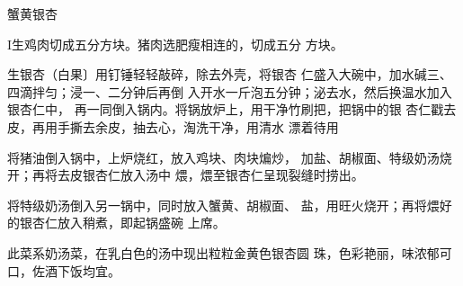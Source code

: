 \begin{recipe}{蟹黄银杏}

\ingredients



\cooking

I生鸡肉切成五分方块。猪肉选肥瘦相连的，切成五分 方块。

生银杏（白果〕用钉锤轻轻敲碎，除去外壳，将银杏 仁盛入大碗中，加水碱三、四滴拌匀；浸一、二分钟后再倒 入开水一斤泡五分钟；泌去水，然后换温水加入银杏仁中， 再一同倒入锅内。将锅放炉上，用干净竹刷把，把锅中的银 杏仁戳去皮，再用手撕去余皮，抽去心，淘洗干净，用清水 漂着待用

\step 将猪油倒入锅中，上炉烧红，放入鸡块、肉块煸炒， 加盐、胡椒面、特级奶汤烧开；再将去皮银杏仁放入汤中 煨，煨至银杏仁呈现裂缝时捞出。

\step 将特级奶汤倒入另一锅中，同时放入蟹黄、胡椒面、 盐，用旺火烧开；再将煨好的银杏仁放入稍煮，即起锅盛碗 上席。

\notes

此菜系奶汤菜，在乳白色的汤中现出粒粒金黄色银杏圆 珠，色彩艳丽，味浓郁可口，佐酒下饭均宜。

\end{recipe}

